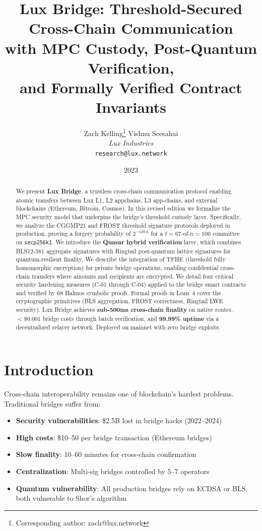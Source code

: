 \documentclass[11pt]{article}
\title{Lux Bridge: Threshold-Secured Cross-Chain Communication\\with MPC Custody, Post-Quantum Verification,\\and Formally Verified Contract Invariants}
\author{
Zach Kelling\thanks{Corresponding author: zach@lux.network}
\quad
Vishnu Seesahai\\
\textit{Lux Industries}\\
\texttt{research@lux.network}
}
\date{2023}
\begin{document}
\luxcoverpage
\maketitle

\begin{abstract}
We present \textbf{Lux Bridge}, a trustless cross-chain communication protocol enabling atomic transfers between Lux L1, L2 appchains, L3 app-chains, and external blockchains (Ethereum, Bitcoin, Cosmos). In this revised edition we formalize the MPC security model that underpins the bridge's threshold custody layer. Specifically, we analyze the CGGMP21 and FROST threshold signature protocols deployed in production, proving a forgery probability of $2^{-139.6}$ for a $t = 67$-of-$n = 100$ committee on \texttt{secp256k1}. We introduce the \textbf{Quasar hybrid verification} layer, which combines BLS12-381 aggregate signatures with Ringtail post-quantum lattice signatures for quantum-resilient finality. We describe the integration of TFHE (threshold fully homomorphic encryption) for private bridge operations, enabling confidential cross-chain transfers where amounts and recipients are encrypted. We detail four critical security hardening measures (C-01 through C-04) applied to the bridge smart contracts and verified by 68 Halmos symbolic proofs. Formal proofs in Lean~4 cover the cryptographic primitives (BLS aggregation, FROST correctness, Ringtail LWE security). Lux Bridge achieves \textbf{sub-500ms cross-chain finality} on native routes, \textbf{$< \$0.001$} bridge costs through batch verification, and \textbf{99.99\% uptime} via a decentralized relayer network. Deployed on mainnet with zero bridge exploits.
\end{abstract}

\section{Introduction}

Cross-chain interoperability remains one of blockchain's hardest problems. Traditional bridges suffer from:
\begin{itemize}[leftmargin=1.1em]
  \item \textbf{Security vulnerabilities}: \$2.5B lost in bridge hacks (2022--2024)
  \item \textbf{High costs}: \$10--50 per bridge transaction (Ethereum bridges)
  \item \textbf{Slow finality}: 10--60 minutes for cross-chain confirmation
  \item \textbf{Centralization}: Multi-sig bridges controlled by 5--7 operators
  \item \textbf{Quantum vulnerability}: All production bridges rely on ECDSA or BLS, both vulnerable to Shor's algorithm
\end{itemize}
\end{document}
